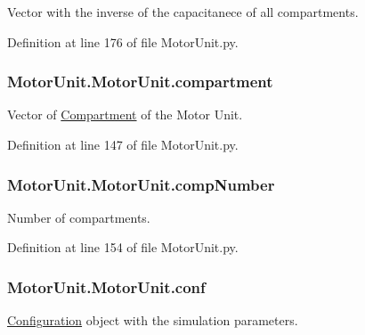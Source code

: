 Vector with the inverse of the capacitanece of all compartments. 



Definition at line 176 of file Motor\-Unit.\-py.

\hypertarget{class_motor_unit_1_1_motor_unit_a6d4da7327031b3cb9c7041a4a790e524}{
\subsubsection[{compartment}]{\setlength{\rightskip}{0pt plus 5cm}Motor\-Unit.\-Motor\-Unit.\-compartment}}\label{class_motor_unit_1_1_motor_unit_a6d4da7327031b3cb9c7041a4a790e524}


Vector of \hyperlink{namespace_compartment}{Compartment} of the Motor Unit. 



Definition at line 147 of file Motor\-Unit.\-py.

\hypertarget{class_motor_unit_1_1_motor_unit_afe7281fb12c41102980b6b48d5a49713}{
\subsubsection[{comp\-Number}]{\setlength{\rightskip}{0pt plus 5cm}Motor\-Unit.\-Motor\-Unit.\-comp\-Number}}\label{class_motor_unit_1_1_motor_unit_afe7281fb12c41102980b6b48d5a49713}


Number of compartments. 



Definition at line 154 of file Motor\-Unit.\-py.

\hypertarget{class_motor_unit_1_1_motor_unit_a10539f5129881188923f3a3a164d2cba}{
\subsubsection[{conf}]{\setlength{\rightskip}{0pt plus 5cm}Motor\-Unit.\-Motor\-Unit.\-conf}}\label{class_motor_unit_1_1_motor_unit_a10539f5129881188923f3a3a164d2cba}


\hyperlink{namespace_configuration}{Configuration} object with the simulation parameters. 



